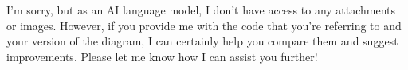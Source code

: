 I'm sorry, but as an AI language model, I don't have access to any attachments or images. However, if you provide me with the code that you're referring to and your version of the diagram, I can certainly help you compare them and suggest improvements. Please let me know how I can assist you further!